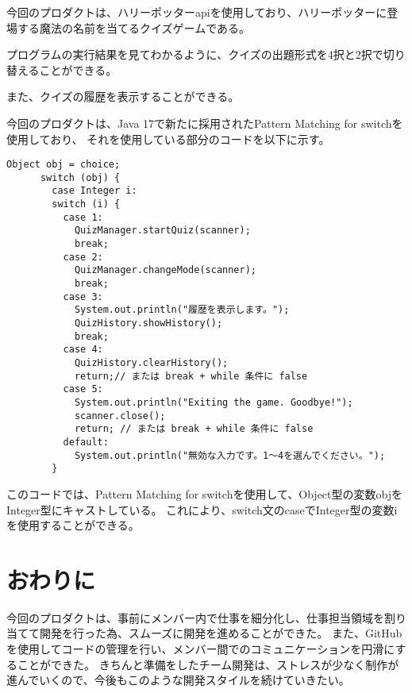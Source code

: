 \documentclass[uplatex,dvipdfmx,a4paper]{jsarticle}
\begin{document}
\par 今回のプロダクトは、ハリーポッターapiを使用しており、ハリーポッターに登場する魔法の名前を当てるクイズゲームである。
\par プログラムの実行結果を見てわかるように、クイズの出題形式を4択と2択で切り替えることができる。
\par また、クイズの履歴を表示することができる。
\par 今回のプロダクトは、Java 17で新たに採用されたPattern Matching for switchを使用しており、
それを使用している部分のコードを以下に示す。
\begin{lstlisting}[style=source]
  Object obj = choice;
      switch (obj) {
        case Integer i:
        switch (i) {
          case 1:
            QuizManager.startQuiz(scanner);
            break;
          case 2:
            QuizManager.changeMode(scanner);
            break;
          case 3:
            System.out.println("履歴を表示します。");
            QuizHistory.showHistory();
            break;
          case 4:
            QuizHistory.clearHistory();
            return;// または break + while 条件に false
          case 5:
            System.out.println("Exiting the game. Goodbye!");
            scanner.close();
            return; // または break + while 条件に false
          default:
            System.out.println("無効な入力です。1〜4を選んでください。");
        }

\end{lstlisting}

このコードでは、Pattern Matching for switchを使用して、Object型の変数objをInteger型にキャストしている。
これにより、switch文のcaseでInteger型の変数iを使用することができる。






\section{おわりに}
今回のプロダクトは、事前にメンバー内で仕事を細分化し、仕事担当領域を割り当てて開発を行った為、スムーズに開発を進めることができた。
また、GitHubを使用してコードの管理を行い、メンバー間でのコミュニケーションを円滑にすることができた。
きちんと準備をしたチーム開発は、ストレスが少なく制作が進んでいくので、今後もこのような開発スタイルを続けていきたい。
\end{document}
